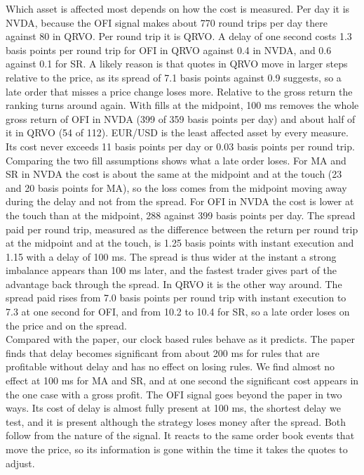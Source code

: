 \documentclass{article}
\begin{document}
\noindent Which asset is affected most depends on how the cost is measured. Per day it is NVDA, because the OFI signal makes about 770 round trips per day there against 80 in QRVO. Per round trip it is QRVO. A delay of one second costs 1.3 basis points per round trip for OFI in QRVO against 0.4 in NVDA, and 0.6 against 0.1 for SR. A likely reason is that quotes in QRVO move in larger steps relative to the price, as its spread of 7.1 basis points against 0.9 suggests, so a late order that misses a price change loses more. Relative to the gross return the ranking turns around again. With fills at the midpoint, 100 ms removes the whole gross return of OFI in NVDA (399 of 359 basis points per day) and about half of it in QRVO (54 of 112). EUR/USD is the least affected asset by every measure. Its cost never exceeds 11 basis points per day or 0.03 basis points per round trip.\\

\noindent Comparing the two fill assumptions shows what a late order loses. For MA and SR in NVDA the cost is about the same at the midpoint and at the touch (23 and 20 basis points for MA), so the loss comes from the midpoint moving away during the delay and not from the spread. For OFI in NVDA the cost is lower at the touch than at the midpoint, 288 against 399 basis points per day. The spread paid per round trip, measured as the difference between the return per round trip at the midpoint and at the touch, is 1.25 basis points with instant execution and 1.15 with a delay of 100 ms. The spread is thus wider at the instant a strong imbalance appears than 100 ms later, and the fastest trader gives part of the advantage back through the spread. In QRVO it is the other way around. The spread paid rises from 7.0 basis points per round trip with instant execution to 7.3 at one second for OFI, and from 10.2 to 10.4 for SR, so a late order loses on the price and on the spread.\\

\noindent Compared with the paper, our clock based rules behave as it predicts. The paper finds that delay becomes significant from about 200 ms for rules that are profitable without delay and has no effect on losing rules. We find almost no effect at 100 ms for MA and SR, and at one second the significant cost appears in the one case with a gross profit. The OFI signal goes beyond the paper in two ways. Its cost of delay is almost fully present at 100 ms, the shortest delay we test, and it is present although the strategy loses money after the spread. Both follow from the nature of the signal. It reacts to the same order book events that move the price, so its information is gone within the time it takes the quotes to adjust.\\
\end{document}
